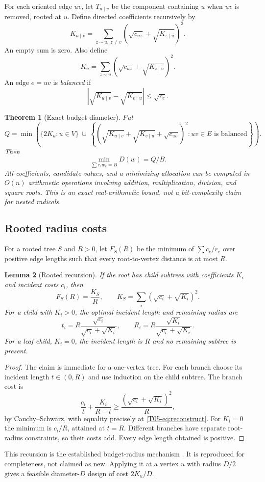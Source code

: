\documentclass[11pt,a4paper]{article}
\newtheorem{theorem}{Theorem}[section]
\newtheorem{lemma}[theorem]{Lemma}
\theoremstyle{definition}\newtheorem{definition}[theorem]{Definition}
\theoremstyle{remark}\newtheorem{remark}[theorem]{Remark}
\numberwithin{equation}{section}
\begin{document}
For each oriented edge $uv$, let $T_{u\mid v}$ be the component containing $u$ when $uv$ is removed, rooted at $u$. Define directed coefficients recursively by
\begin{equation}\label{T05-eq:rec}
 K_{u\mid v}=\sum_{z\sim u,\ z\ne v}
 \left(\sqrt{c_{uz}}+\sqrt{K_{z\mid u}}\right)^2.
\end{equation}
An empty sum is zero. Also define
\[
 K_u=\sum_{z\sim u}\left(\sqrt{c_{uz}}+\sqrt{K_{z\mid u}}\right)^2.
\]
An edge $e=uv$ is \emph{balanced} if
\begin{equation}\label{T05-eq:balance}
 \left|\sqrt{K_{u\mid v}}-\sqrt{K_{v\mid u}}\right|\le\sqrt{c_e}.
\end{equation}
\begin{theorem}[Exact budget diameter]\label{T05-thm:main}
Put
\[
 Q=\min\left(\{2K_u:u\in V\}\ \cup\
 \left\{\left(\sqrt{K_{u\mid v}}+\sqrt{K_{v\mid u}}+\sqrt{c_{uv}}\right)^2:
 uv\in E\text{ is balanced}\right\}\right).
\]
Then
\[
 \min_{\sum c_ew_e=B}D(w)=Q/B.
\]
All coefficients, candidate values, and a minimizing allocation can be computed in $O(n)$ arithmetic operations involving addition, multiplication, division, and square roots. This is an exact real-arithmetic bound, not a bit-complexity claim for nested radicals.
\end{theorem}

\subsection{Rooted radius costs}\label{T05-sec-2}
For a rooted tree $S$ and $R>0$, let $F_S(R)$ be the minimum of $\sum c_e/r_e$ over positive edge lengths such that every root-to-vertex distance is at most $R$.
\begin{lemma}[Rooted recursion]\label{T05-lem:root}
If the root has child subtrees with coefficients $K_i$ and incident costs $c_i$, then
\[
 F_S(R)=\frac{K_S}{R},\qquad
 K_S=\sum_i(\sqrt{c_i}+\sqrt{K_i})^2.
\]
For a child with $K_i>0$, the optimal incident length and remaining radius are
\begin{equation}\label{T05-eq:reconstruct}
 t_i=R\frac{\sqrt{c_i}}{\sqrt{c_i}+\sqrt{K_i}},\qquad
 R_i=R\frac{\sqrt{K_i}}{\sqrt{c_i}+\sqrt{K_i}}.
\end{equation}
For a leaf child, $K_i=0$, the incident length is $R$ and no remaining subtree is present.
\end{lemma}
\begin{proof}
The claim is immediate for a one-vertex tree. For each branch choose its incident length $t\in(0,R)$ and use induction on the child subtree. The branch cost is
\[
 \frac{c_i}{t}+\frac{K_i}{R-t}\ge\frac{(\sqrt{c_i}+\sqrt{K_i})^2}{R},
\]
by Cauchy--Schwarz, with equality precisely at \eqref{T05-eq:reconstruct}. For $K_i=0$ the minimum is $c_i/R$, attained at $t=R$. Different branches have separate root-radius constraints, so their costs add. Every edge length obtained is positive.
\end{proof}
This recursion is the established budget-radius mechanism \cite{ref044}. It is reproduced for completeness, not claimed as new. Applying it at a vertex $u$ with radius $D/2$ gives a feasible diameter-$D$ design of cost $2K_u/D$.
\end{document}
